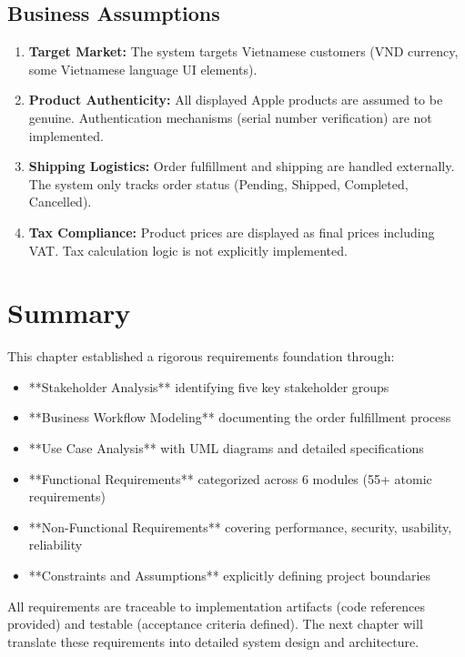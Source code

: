 \documentclass[12pt, a4paper]{report}
\begin{document}
\subsection{Business Assumptions}

\begin{enumerate}
    \item \textbf{Target Market:} The system targets Vietnamese customers (VND currency, some Vietnamese language UI elements).
    
    \item \textbf{Product Authenticity:} All displayed Apple products are assumed to be genuine. Authentication mechanisms (serial number verification) are not implemented.
    
    \item \textbf{Shipping Logistics:} Order fulfillment and shipping are handled externally. The system only tracks order status (Pending, Shipped, Completed, Cancelled).
    
    \item \textbf{Tax Compliance:} Product prices are displayed as final prices including VAT. Tax calculation logic is not explicitly implemented.
\end{enumerate}

\section{Summary}

This chapter established a rigorous requirements foundation through:

\begin{itemize}
    \item **Stakeholder Analysis** identifying five key stakeholder groups
    \item **Business Workflow Modeling** documenting the order fulfillment process
    \item **Use Case Analysis** with UML diagrams and detailed specifications
    \item **Functional Requirements** categorized across 6 modules (55+ atomic requirements)
    \item **Non-Functional Requirements** covering performance, security, usability, reliability
    \item **Constraints and Assumptions** explicitly defining project boundaries
\end{itemize}

All requirements are traceable to implementation artifacts (code references provided) and testable (acceptance criteria defined). The next chapter will translate these requirements into detailed system design and architecture.
\end{document}
